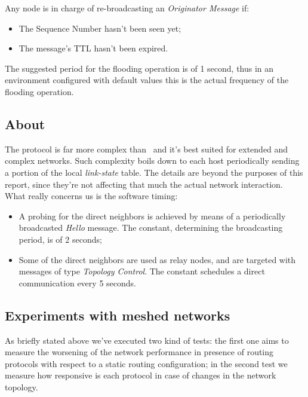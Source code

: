     Any node is in charge of re-broadcasting an \emph{Originator Message}
    if:
    \begin{itemize}
    \item   The Sequence Number hasn't been seen yet;
    \item   The message's TTL hasn't been expired.
    \end{itemize}

    The suggested period for the flooding operation is of 1 second, thus
    in an environment configured with default values this is the actual
    frequency of the flooding operation.

\subsection{About \olsr}

    The protocol is far more complex than \batman\ and it's best suited for
    extended and complex networks. Such complexity boils down to
    each host periodically sending a portion of the local \emph{link-state}
    table. The details are beyond the purposes of this report, since
    they're not affecting that much the actual network interaction. What
    really concerns us is the software timing:
    \begin{itemize}
    \item   A probing for the direct neighbors is achieved by means of a
            periodically broadcasted \emph{Hello} message. The
             constant, determining the broadcasting
            period, is of 2 seconds;
    \item   Some of the direct neighbors are used as relay nodes, and are
            targeted with messages of type \emph{Topology Control}.
            The  constant schedules a direct
            communication every 5 seconds.
    \end{itemize}

\subsection{Experiments with meshed networks}
    As briefly stated above we've executed two kind of tests: the
    first one aims to measure the worsening of the network
    performance in presence of routing protocols with respect to a static
    routing configuration; in the second test we measure how
    responsive is each protocol in case of changes in the network
    topology.

